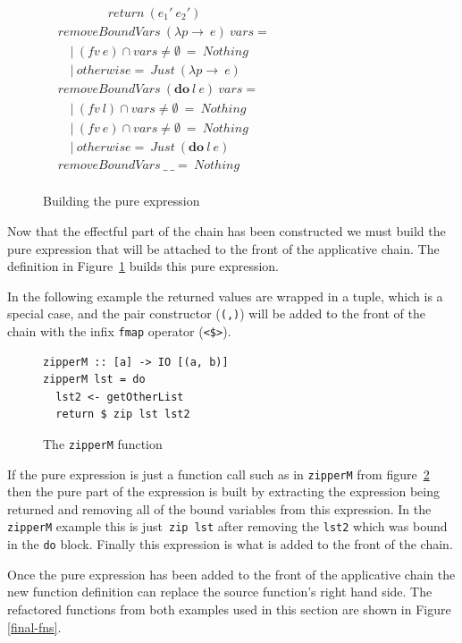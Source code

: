\begin{figure}
\begin{math}
\begin{aligned}
&\qquad \qquad return\ (e_1'\ e_2')\\
&removeBoundVars\ (\lambda p \rightarrow\ e)\ vars =\\
&\quad |\ (fv\ e) \cap vars \neq \emptyset\ =\ Nothing\\
&\quad |\ otherwise =\ Just\ (\lambda p \rightarrow\ e)\\
&removeBoundVars\ (\textbf{do}\ l\ e)\ vars =\\
&\quad |\ (fv\ l) \cap vars \neq \emptyset\ =\ Nothing\\
&\quad |\ (fv\ e) \cap vars \neq \emptyset\ =\ Nothing\\
&\quad |\ otherwise =\ Just\ (\textbf{do}\ l\ e)\\
&removeBoundVars\ \_\ \_ =\ Nothing\\
\end{aligned}
\end{math}
\caption{Building the pure expression}
\label{pure}
\end{figure}
Now that the effectful part of the chain has been constructed we must build the pure expression that will be attached to the front of the applicative chain. The definition in Figure~\ref{pure} builds this pure expression. 

In the following example the returned values are wrapped in a tuple, which is a special case, and the pair constructor (\texttt{(,)}) will be added to the front of the chain with the infix \texttt{fmap} operator (\texttt{<\$>}).

\begin{figure}[t]
\begin{lstlisting}
zipperM :: [a] -> IO [(a, b)]
zipperM lst = do
  lst2 <- getOtherList
  return $ zip lst lst2
\end{lstlisting}
\caption{The \texttt{zipperM} function}
\label{zipperM}
\end{figure}

If the pure expression is just a function call such as in \texttt{zipperM} from figure~\ref{zipperM} then the pure part of the expression is built by extracting the expression being returned and removing all of the bound variables from this expression. In the \texttt{zipperM} example this is just~\texttt{zip lst} after removing the \texttt{lst2} which was bound in the \texttt{do} block. Finally this expression is what is added to the front of the chain.

Once the pure expression has been added to the front of the applicative chain the new function definition can replace the source function's right hand side. The refactored functions from both examples used in this section are shown in Figure \ref{final-fns}.

